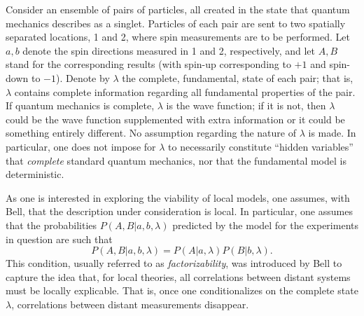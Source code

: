 \documentclass[letterpaper,12pt]{article}
\begin{document}
Consider an ensemble of pairs of particles, all created in the state that quantum mechanics describes as a singlet. Particles of each pair are sent to two spatially separated locations, 1 and 2, where spin measurements are to be performed. Let $a,b$ denote the spin directions measured in 1 and 2, respectively, and let $A,B$ stand for the corresponding results (with spin-up corresponding to $+1$ and spin-down to $-1$). Denote by $\lambda$ the complete, fundamental, state of each pair; that is, $\lambda$ contains complete information regarding all fundamental properties of the pair. If quantum mechanics is complete, $\lambda$ is the wave function; if it is not, then $\lambda$ could be the wave function supplemented with extra information or it could be something entirely different. No assumption regarding the nature of $\lambda$ is made. In particular, one does not impose for $\lambda$ to necessarily constitute ``hidden variables'' that \emph{complete} standard quantum mechanics, nor that the fundamental model is deterministic.

As one is interested in exploring the viability of local models, one assumes, with Bell, that the description under consideration is local. In particular, one assumes that the probabilities $P\left(A,B|a,b,\lambda\right)$ predicted by the model for the experiments in question are such that
\begin{equation}\label{fac}
P\left(A,B|a,b,\lambda\right) = P\left(A|a,\lambda\right) P\left(B|b,\lambda\right).
\end{equation}
This condition, usually referred to as \emph{factorizability}, was introduced by Bell to capture the idea that, for local theories, all correlations between distant systems must be locally explicable. That is, once one conditionalizes on the complete state $\lambda$, correlations between distant measurements disappear.
\end{document}
